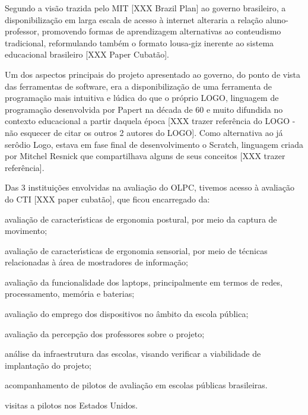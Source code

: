 \documentclass[
12pt,		%
openright,	%
twoside,  %
a4paper,			%
chapter=TITLE,		%
english,			%
french,				%
spanish,			%
brazil				%
]{USPSC-classe/USPSC_RedarTex}
\begin{document}
Segundo a vis\~ao trazida pelo MIT [XXX Brazil Plan] ao governo brasileiro, a disponibiliza\c{c}\~ao em larga escala de acesso \`a internet alteraria a rela\c{c}\~ao aluno-professor, promovendo formas de aprendizagem alternativas ao conteudismo tradicional, reformulando tamb\'em o formato lousa-giz inerente ao sistema educacional brasileiro [XXX Paper Cubat\~ao].










Um dos aspectos principais do projeto apresentado ao governo, do ponto de vista das ferramentas de software, era a disponibiliza\c{c}\~ao de uma ferramenta de programa\c{c}\~ao mais intuitiva e l\'udica do que o pr\'oprio LOGO, linguagem de programa\c{c}\~ao desenvolvida por Papert na d\'ecada de 60 e muito difundida no contexto educacional a partir daquela \'epoca [XXX trazer refer\^encia do LOGO - n\~ao esquecer de citar os outros 2 autores do LOGO]. Como alternativa ao j\'a ser\^odio Logo, estava em fase final de desenvolvimento o Scratch, linguagem criada por Mitchel Resnick que compartilhava alguns de seus conceitos [XXX trazer refer\^encia].










Das 3 institui\c{c}\~oes envolvidas na avalia\c{c}\~ao do OLPC, tivemos acesso \`a avalia\c{c}\~ao do CTI [XXX paper cubat\~ao], que ficou encarregado da:











\begin{alineas}
\item avalia\c{c}\~ao de caracter\'{\i}sticas de ergonomia postural, por meio da captura de movimento;
\item avalia\c{c}\~ao de caracter\'{\i}sticas de ergonomia sensorial, por meio de t\'ecnicas relacionadas \`a \'area de mostradores de informa\c{c}\~ao;
\item avalia\c{c}\~ao da funcionalidade dos \textquotedbl laptops, principalmente em termos de redes, processamento, mem\'oria e baterias;
\item avalia\c{c}\~ao do emprego dos dispositivos no \^ambito da escola p\'ublica;
\item avalia\c{c}\~ao da percep\c{c}\~ao dos professores sobre o projeto;
\item an\'alise da infraestrutura das escolas, visando verificar a viabilidade de implanta\c{c}\~ao do projeto;
\item acompanhamento de pilotos de avalia\c{c}\~ao em escolas p\'ublicas brasileiras.
\item visitas a pilotos nos Estados Unidos.
\end{alineas}
\end{document}
